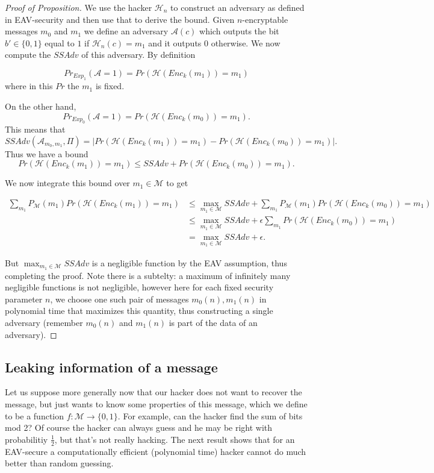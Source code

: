\documentclass[twoside, a4paper, 10pt]{amsart}
\begin{document}
\begin{proof}[Proof of Proposition] We use the hacker $\mathcal{H}_n$ to construct an adversary as defined in EAV-security and then use that to derive the bound. Given $n$-encryptable messages $m_0$ and $m_1$ we define an adversary $\mathcal{A}(c)$ which outputs the bit $b' \in \{0,1\}$ equal to $1$ if $\mathcal{H}_n(c) = m_1$ and it outputs $0$ otherwise. We now compute the $SSAdv$ of this adversary. By definition

$$Pr_{Exp_1} (\mathcal{A} = 1) =  Pr(\mathcal{H} (Enc_k(m_1)) = m_1)$$ where in this $Pr$ the $m_1$ is fixed.

On the other hand, $$Pr_{Exp_0} (\mathcal{A} = 1) = Pr(\mathcal{H} (Enc_k(m_0)) = m_1).$$ This means that $$SSAdv(\mathcal{A}_{m_0, m_1}, \Pi) = \left| Pr(\mathcal{H} (Enc_k(m_1)) = m_1) - Pr(\mathcal{H} (Enc_k(m_0)) = m_1) \right|.$$ Thus we have a bound $$Pr(\mathcal{H} (Enc_k(m_1)) = m_1) \leq SSAdv + Pr(\mathcal{H} (Enc_k(m_0)) = m_1). $$

We now integrate this bound over $m_1 \in \mathcal{M}$ to get

\begin{align*} \sum_{m_1} P_{\mathcal{M}} (m_1) Pr(\mathcal{H} (Enc_k(m_1)) = m_1)  & \leq \max_{m_1 \in \mathcal{M}} SSAdv + \sum_{m_1} P_{\mathcal{M}} (m_1) Pr(\mathcal{H} (Enc_k(m_0)) = m_1)   \\ & \leq \max_{m_1 \in \mathcal{M}} SSAdv + \epsilon \sum_{m_1} Pr(\mathcal{H} (Enc_k(m_0)) = m_1)  \\ & =  \max_{m_1 \in \mathcal{M}} SSAdv + \epsilon.   \end{align*}

But  $\max_{m_1 \in \mathcal{M}} SSAdv$ is a negligible function by the EAV assumption, thus completing the proof. Note there is a subtelty: a maximum of infinitely many negligible functions is not negligible, however here for each fixed security parameter $n$, we choose one such pair of messages $m_0(n), m_1(n)$ in polynomial time that maximizes this quantity, thus constructing a single adversary (remember $m_0(n)$ and $m_1(n)$ is part of the data of an adversary). 
\end{proof}

\subsection{Leaking information of a message} Let us suppose more generally now that our hacker does not want to recover the message, but just wants to know some properties of this message, which we define to be a function $f:\mathcal{M} \to \{0,1\}$. For example, can the hacker find the sum of bits mod 2? Of course the hacker can always guess and he may be right with probabilitiy $\frac{1}{2}$, but that's not really hacking. The next result shows that for an EAV-secure a computationally efficient (polynomial time) hacker cannot do much better than random guessing.
\end{document}
